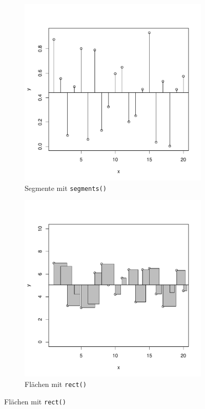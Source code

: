 \begin{figure}[h!]
\begin{subfigure}[b]{0.48\textwidth}
\includegraphics{r-cmd-024}
\caption{Segmente mit \lstinline{segments()}}
\end{subfigure}
\begin{subfigure}[b]{0.48\textwidth}
\includegraphics{r-cmd-025}
\caption{Flächen mit \lstinline{rect()}}
\end{subfigure}

\end{figure}

